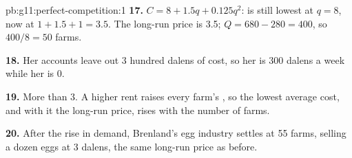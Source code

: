 \begin{solution}{pb:g11:perfect-competition:1}
\textbf{17.} $C = 8 + 1.5q + 0.125q^2$:  is still lowest at $q = 8$, now at $1 + 1.5 + 1 = 3.5$. The long-run price is 3.5; $Q = 680 - 280 = 400$, so
$400/8 = 50$ farms.

\textbf{18.} Her accounts leave out 3 hundred dalens of cost, so her  is 300 dalens a week while her  is 0.

\textbf{19.} More than 3. A higher rent raises every farm's , so the lowest average cost, and with it the long-run price, rises with the number of
farms.

\textbf{20.} After the rise in demand, Brenland's egg industry settles at 55 farms, selling a dozen eggs at 3 dalens, the same long-run price as before.
\end{solution}
